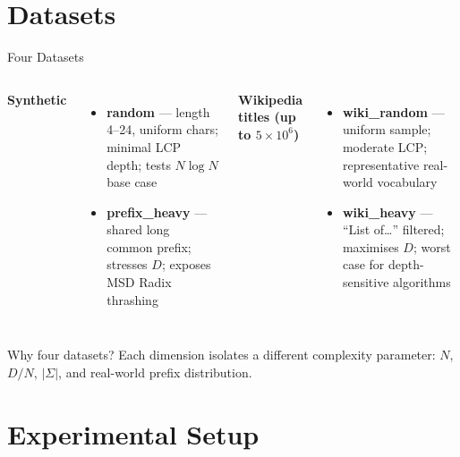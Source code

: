\documentclass[aspectratio=169]{beamer}
\begin{document}
\section{Datasets}

\begin{frame}{Four Datasets}
  \begin{columns}
      \textbf{Synthetic}
      \begin{itemize}
        \item \textbf{random} — length 4--24, uniform chars;
              minimal LCP depth; tests $N\log N$ base case
        \item \textbf{prefix\_heavy} — shared long common prefix;
              stresses $D$; exposes MSD Radix thrashing
      \end{itemize}
      \textbf{Wikipedia titles (up to $5\times10^6$)}
      \begin{itemize}
        \item \textbf{wiki\_random} — uniform sample;
              moderate LCP; representative real-world vocabulary
        \item \textbf{wiki\_heavy} — ``List of\ldots'' filtered;
              maximises $D$; worst case for depth-sensitive
              algorithms
      \end{itemize}
  \end{columns}
  \vspace{0.4em}
  \begin{alertblock}{Why four datasets?}
    Each dimension isolates a different complexity parameter:
    $N$, $D/N$, $|\Sigma|$, and real-world prefix distribution.
  \end{alertblock}
\end{frame}

\section{Experimental Setup}
\end{document}
